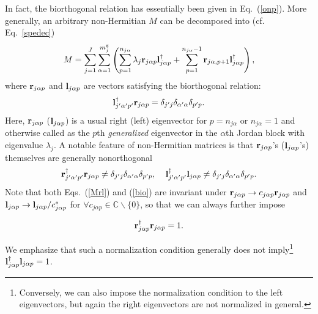 \documentclass{tADP2e}
\theoremstyle{plain}
\newcommand{\eqn}[1]{
\begin{eqnarray}
	#1
\end{eqnarray}
}
\theoremstyle{plain}
\theoremstyle{definition}
\begin{document}
In fact, the biorthogonal relation has essentially been given in Eq.~(\ref{onp}). More generally, an arbitrary  non-Hermitian $M$ can be decomposed into (cf. Eq.~\eqref{spedec})
\begin{equation}
M=\sum^J_{j=1}\sum^{m^{\rm g}_j}_{\alpha=1}\left(\sum^{n_{j\alpha}}_{p=1}\lambda_j\bold{r}_{j\alpha p}\bold{l}_{j\alpha p}^\dag+\sum^{n_{j\alpha}-1}_{p=1}\bold{r}_{j\alpha, p+1} \bold{l}_{j\alpha p}^\dag\right),
\label{Mrl}
\end{equation}
where $\bold{r}_{j\alpha p}$ and $\bold{l}_{j\alpha p}$ are vectors satisfying the biorthogonal relation:
\begin{equation}
\bold{l}_{j'\alpha' p'}^\dag\bold{r}_{j\alpha p}=\delta_{j'j}\delta_{\alpha'\alpha}\delta_{p'p}.
\label{bio}
\end{equation}
Here, $\bold{r}_{j\alpha p}$ ($\bold{l}_{j\alpha p}$) is a usual right (left) eigenvector for $p=n_{j\alpha}$ or $n_{j\alpha}=1$ and otherwise called as the $p$th {\it generalized}  eigenvector in the $\alpha$th Jordan block with eigenvalue $\lambda_j$. 
A notable feature of non-Hermitian matrices is that $\bold{r}_{j\alpha p}$'s ($\bold{l}_{j\alpha p}$'s) themselves are generally nonorthogonal
\begin{equation}\label{nonorthorr}
\bold{r}_{j'\alpha' p'}^\dag\bold{r}_{j\alpha p}\neq\delta_{j'j}\delta_{\alpha'\alpha}\delta_{p'p},\;\;\;\;
\bold{l}_{j'\alpha' p'}^\dag\bold{l}_{j\alpha p}\neq\delta_{j'j}\delta_{\alpha'\alpha}\delta_{p'p}.
\end{equation}
Note that both Eqs.~(\ref{Mrl}) and (\ref{bio}) are invariant under $\bold{r}_{j\alpha p}\to c_{j\alpha p} \bold{r}_{j\alpha p}$ and $\bold{l}_{j\alpha p}\to \bold{l}_{j\alpha p}/c_{j\alpha p}^*$ for $\forall c_{j\alpha p}\in\mathbb{C}\backslash\{0\}$, so that we can always further impose 
\eqn{\label{rrnorm}
\bold{r}_{j\alpha p}^{\dagger}\bold{r}_{j\alpha p}=1.
} 
We emphasize that such a normalization condition generally does not imply\footnote{Conversely, we can also impose the normalization condition to the left eigenvectors, but again the right eigenvectors are not normalized in general.} $\bold{l}_{j\alpha p}^{\dagger}\bold{l}_{j\alpha p}=1$. 
\end{document}
